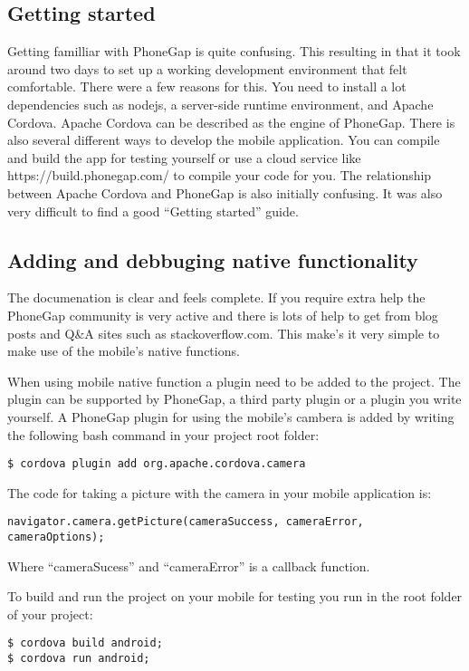 \subsection{Getting started}
Getting familliar with PhoneGap is quite confusing. This resulting in that it took around two days to set up a working development environment that felt comfortable. There were a few reasons for this. You need to install a lot dependencies such as nodejs, a server-side runtime environment, and Apache Cordova. Apache Cordova can be described as the engine of PhoneGap. There is also several different ways to develop the mobile application. You can compile and build the app for testing yourself or use a cloud service like https://build.phonegap.com/ to compile your code for you. The relationship between Apache Cordova and PhoneGap is also initially confusing. It was also very difficult to find a good “Getting started” guide.

\subsection{Adding and debbuging native functionality}
The documenation is clear and feels complete. If you require extra help the PhoneGap community is very active and there is lots of help to get from blog posts and Q\&A sites such as stackoverflow.com. This make’s it very simple to make use of the mobile’s native functions. 

When using mobile native function a plugin need to be added to the project. The plugin can be supported by PhoneGap, a third party plugin or a plugin you write yourself. A PhoneGap plugin for using the mobile’s cambera is added by writing the following bash command in your project root folder:
\begin{verbatim}
$ cordova plugin add org.apache.cordova.camera
\end{verbatim}
The code for taking a picture with the camera in your mobile application is:
\begin{verbatim}
navigator.camera.getPicture(cameraSuccess, cameraError, cameraOptions);
\end{verbatim}
Where “cameraSucess” and “cameraError” is a callback function. 

To build and run the project on your mobile for testing you run in the root folder of your project:
\begin{verbatim}
$ cordova build android; 
$ cordova run android;
\end{verbatim}

